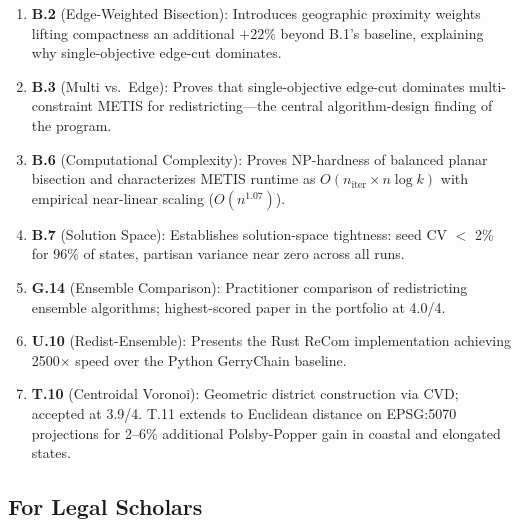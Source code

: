 \documentclass[12pt]{article}
\begin{document}
\begin{enumerate}[leftmargin=*,noitemsep,topsep=2pt]
    \item \textbf{B.2} (Edge-Weighted Bisection): Introduces geographic
        proximity weights lifting compactness an additional $+22\%$ beyond
        B.1's baseline, explaining why single-objective edge-cut dominates.

    \item \textbf{B.3} (Multi vs.\ Edge): Proves that single-objective
        edge-cut dominates multi-constraint METIS for redistricting---the
        central algorithm-design finding of the program.

    \item \textbf{B.6} (Computational Complexity): Proves NP-hardness of
        balanced planar bisection and characterizes METIS runtime as
        $O(n_{\mathrm{iter}} \times n \log k)$ with empirical near-linear
        scaling ($O(n^{1.07})$).

    \item \textbf{B.7} (Solution Space): Establishes solution-space tightness:
        seed CV $<$ 2\% for 96\% of states, partisan variance near zero
        across all runs.

    \item \textbf{G.14} (Ensemble Comparison): Practitioner comparison of
        redistricting ensemble algorithms; highest-scored paper in the
        portfolio at 4.0/4.

    \item \textbf{U.10} (Redist-Ensemble): Presents the Rust ReCom
        implementation achieving 2500$\times$ speed over the Python
        GerryChain baseline.

    \item \textbf{T.10} (Centroidal Voronoi): Geometric district construction
        via CVD; accepted at 3.9/4. T.11 extends to Euclidean distance
        on EPSG:5070 projections for 2--6\% additional Polsby-Popper gain
        in coastal and elongated states.
\end{enumerate}

\subsection{For Legal Scholars}
\end{document}
